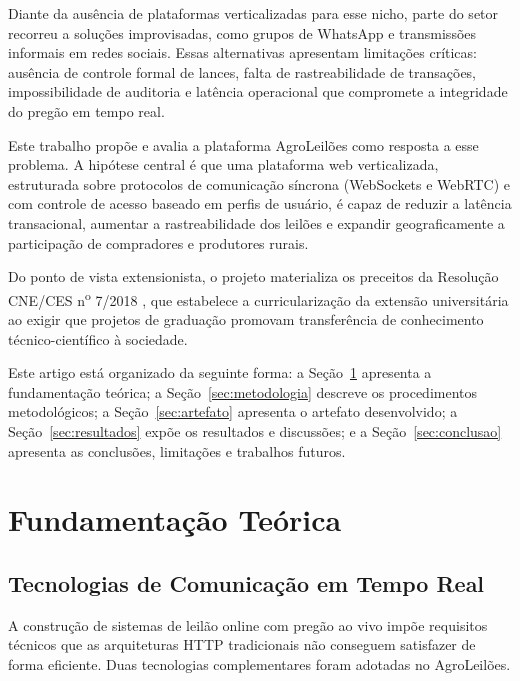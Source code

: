 \documentclass[12pt]{article}
\begin{document}
Diante da ausência de plataformas verticalizadas para esse nicho, parte do setor
recorreu a soluções improvisadas, como grupos de WhatsApp e transmissões informais em
redes sociais. Essas alternativas apresentam limitações críticas: ausência de controle
formal de lances, falta de rastreabilidade de transações, impossibilidade de auditoria
e latência operacional que compromete a integridade do pregão em tempo real.

Este trabalho propõe e avalia a plataforma AgroLeilões como resposta a esse problema.
A hipótese central é que uma plataforma web verticalizada, estruturada sobre protocolos
de comunicação síncrona (WebSockets e WebRTC) e com controle de acesso baseado em
perfis de usuário, é capaz de reduzir a latência transacional, aumentar a
rastreabilidade dos leilões e expandir geograficamente a participação de compradores e
produtores rurais.

Do ponto de vista extensionista, o projeto materializa os preceitos da Resolução
CNE/CES n\textsuperscript{o} 7/2018 \cite{brasil2018}, que estabelece a curricularização
da extensão universitária ao exigir que projetos de graduação promovam transferência de
conhecimento técnico-científico à sociedade.

Este artigo está organizado da seguinte forma: a Seção~\ref{sec:fundamentacao} apresenta
a fundamentação teórica; a Seção~\ref{sec:metodologia} descreve os procedimentos
metodológicos; a Seção~\ref{sec:artefato} apresenta o artefato desenvolvido; a
Seção~\ref{sec:resultados} expõe os resultados e discussões; e a
Seção~\ref{sec:conclusao} apresenta as conclusões, limitações e trabalhos futuros.

\section{Fundamentação Teórica}
\label{sec:fundamentacao}

\subsection{Tecnologias de Comunicação em Tempo Real}

A construção de sistemas de leilão online com pregão ao vivo impõe requisitos técnicos
que as arquiteturas HTTP tradicionais não conseguem satisfazer de forma eficiente. Duas
tecnologias complementares foram adotadas no AgroLeilões.
\end{document}

